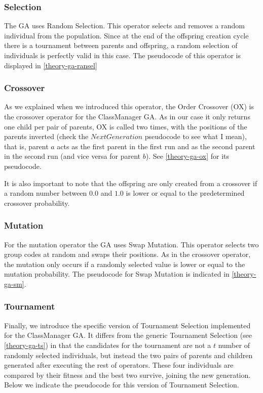 \subsubsection{Selection}

The GA uses Random Selection. This operator selects and removes a random individual from the population. Since at the end of the offspring creation cycle there is a tournament between parents and offspring, a random selection of individuals is perfectly valid in this case. The pseudocode of this operator is displayed in \ref{theory-ga-ransel}


\subsubsection{Crossover}

As we explained when we introduced this operator, the Order Crossover (OX) is the crossover operator for the ClassManager GA. As in our case it only returns one child per pair of parents, OX is called two times, with the positions of the parents inverted (check the $NextGeneration$ pseudocode to see what I mean), that is, parent $a$ acts as the first parent in the first run and as the second parent in the second run (and vice versa for parent $b$). See \ref{theory-ga-ox} for its pseudocode.

It is also important to note that the offspring are only created from a crossover if a random number between $0.0$ and $1.0$ is lower or equal to the predetermined crossover probability.


\subsubsection{Mutation}

For the mutation operator the GA uses Swap Mutation. This operator selects two group codes at random and swaps their positions. As in the crossover operator, the mutation only occurs if a randomly selected value is lower or equal to the mutation probability. The pseudocode for Swap Mutation is indicated in \ref{theory-ga-sm}.   


\subsubsection{Tournament}

Finally, we introduce the specific version of Tournament Selection implemented for the ClassManager GA. It differs from the generic Tournament Selection (see \ref{theory-ga-ts}) in that the candidates for the tournament are not a $t$ number of randomly selected individuals, but instead the two pairs of parents and children generated after executing the rest of operators. These four individuals are compared by their fitness and the best two survive, joining the new generation. Below we indicate the pseudocode for this version of Tournament Selection.

